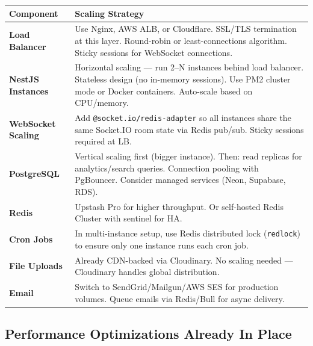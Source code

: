 \documentclass[a4paper,11pt]{article}
\begin{document}
\begin{longtable}{L{4cm} L{11cm}}
\toprule
\textbf{Component} & \textbf{Scaling Strategy} \\
\midrule
\endhead
\textbf{Load Balancer} & Use Nginx, AWS ALB, or Cloudflare. SSL/TLS termination at this layer. Round-robin or least-connections algorithm. Sticky sessions for WebSocket connections. \\
\midrule
\textbf{NestJS Instances} & Horizontal scaling --- run 2--N instances behind load balancer. Stateless design (no in-memory sessions). Use PM2 cluster mode or Docker containers. Auto-scale based on CPU/memory. \\
\midrule
\textbf{WebSocket Scaling} & Add \texttt{@socket.io/redis-adapter} so all instances share the same Socket.IO room state via Redis pub/sub. Sticky sessions required at LB. \\
\midrule
\textbf{PostgreSQL} & Vertical scaling first (bigger instance). Then: read replicas for analytics/search queries. Connection pooling with PgBouncer. Consider managed services (Neon, Supabase, RDS). \\
\midrule
\textbf{Redis} & Upstash Pro for higher throughput. Or self-hosted Redis Cluster with sentinel for HA. \\
\midrule
\textbf{Cron Jobs} & In multi-instance setup, use Redis distributed lock (\texttt{redlock}) to ensure only one instance runs each cron job. \\
\midrule
\textbf{File Uploads} & Already CDN-backed via Cloudinary. No scaling needed --- Cloudinary handles global distribution. \\
\midrule
\textbf{Email} & Switch to SendGrid/Mailgun/AWS SES for production volumes. Queue emails via Redis/Bull for async delivery. \\
\bottomrule
\end{longtable}

\subsection{Performance Optimizations Already In Place}
\end{document}
